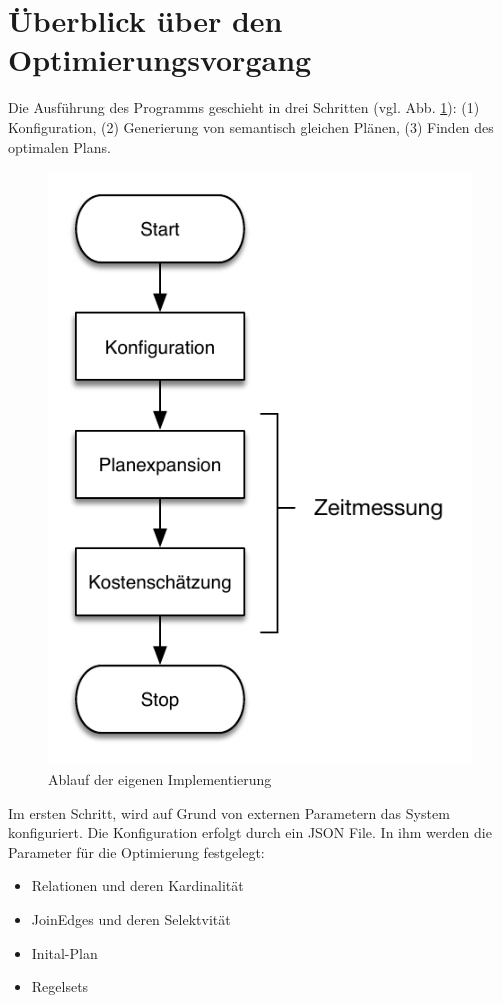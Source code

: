 \section{Überblick über den Optimierungsvorgang}
Die Ausführung des Programms geschieht in drei Schritten (vgl. Abb. \ref{Ablauf}): (1) Konfiguration, (2) Generierung von semantisch gleichen Plänen, (3) Finden des optimalen Plans.

\begin{figure}[h]
  \centering
  \includegraphics{04_Implementierung/Ablauf.pdf}
  \caption{Ablauf der eigenen Implementierung}
  \label{Ablauf}
\end{figure}


Im ersten Schritt, wird auf Grund von externen Parametern das System konfiguriert. Die Konfiguration erfolgt durch ein JSON File. In ihm werden die Parameter für die Optimierung festgelegt:

\begin{itemize}
\item Relationen und deren Kardinalität 
\item JoinEdges und deren Selektvität
\item Inital-Plan
\item Regelsets
\end{itemize}

